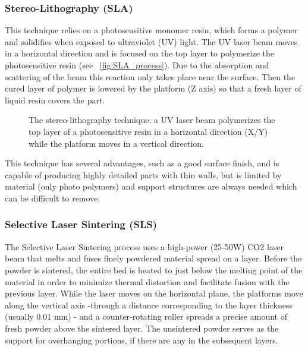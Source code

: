 \subsubsection{Stereo-Lithography (SLA)} %

This technique relies on a photosensitive monomer resin, which forms a polymer and solidifies when exposed to ultraviolet (UV) light. The UV laser beam moves in a horizontal direction and is focused on the top layer to polymerize the photosensitive resin (see \figurename~\ref{fig:SLA_process}). Due to the absorption and scattering of the beam this reaction only takes place near the surface. Then the cured layer of polymer is lowered by the platform (Z axis) so that a fresh layer of liquid resin covers the part.

\begin{figure}[ht]
    \centering
        \hfil
        \hfil
    \caption{The stereo-lithography technique: a UV laser beam polymerizes the top layer of a photosensitive resin in a horizontal direction (X/Y) while the platform moves in a vertical direction.}
    \label{fig:SLA_technique}
\end{figure}

This technique has several advantages, such as a good surface finish, and is capable of producing highly detailed parts with thin walls, but is limited by material (only photo polymers) and support structures are always needed which can be difficult to remove.

\subsubsection{Selective Laser Sintering (SLS)} %
The Selective Laser Sintering process uses a high-power (25-50W) CO2 laser beam that melts and fuses finely powdered material spread on a layer. Before the powder is sintered, the entire bed is heated to just below the melting point of the material in order to minimize thermal distortion and facilitate fusion with the previous layer.
While the laser moves on the horizontal plane, the platforms move along the vertical axis -through a distance corresponding to the layer thickness (usually 0.01 mm) - and a counter-rotating roller spreads a precise amount of fresh powder above the sintered layer. The unsintered powder serves as the support for overhanging portions, if there are any in the subsequent layers.

